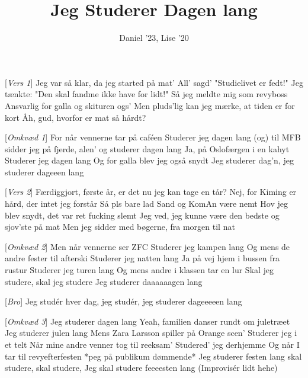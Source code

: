 \documentclass{article}
\title{Jeg Studerer Dagen lang}
\author{Daniel '23, Lise '20}
\begin{document}
\maketitle
\begin{roles}
\end{roles}

\begin{song}
    [\textit{Vers 1}] Jeg var så klar, da jeg started på mat'
    All' sagd' "Studielivet er fedt!"
    Jeg tænkte: "Den skal fandme ikke have for lidt!" 
    Så jeg meldte mig som revyboss
    Ansvarlig for galla og skituren ogs'
    Men pluds'lig kan jeg mærke, at tiden er for kort
    Åh, gud, hvorfor er mat så hårdt?

    [\textit{Omkvæd 1}] For når vennerne tar på caféen
     Studerer jeg dagen lang
     (og) til MFB sidder jeg på fjerde, alen'
     og studerer dagen lang
     Ja, på Oslofærgen i en kahyt
     Studerer jeg dagen lang
     Og for galla blev jeg også snydt
     Jeg studerer dag'n, jeg studerer dageeen lang

    [\textit{Vers 2}] Færdiggjort, første år, er det nu jeg kan tage en tår?  
    Nej, for Kiming er hård, der intet jeg forstår
    Så pls bare lad Sand og KomAn være nemt 
    Hov jeg blev snydt, det var ret fucking slemt
    Jeg ved, jeg kunne være den bedste og sjov'ste på mat
    Men jeg sidder med bøgerne, fra morgen til nat

    [\textit{Omkvæd 2}] Men når vennerne ser ZFC
     Studerer jeg kampen lang
     Og mens de andre fester til afterski
     Studerer jeg natten lang
     Ja på vej hjem i bussen fra rustur 
     Studerer jeg turen lang
     Og mens andre i klassen tar en lur 
     Skal jeg studere, skal jeg studere
    Jeg studerer daaaaaagen lang

    [\textit{Bro}] Jeg studér hver dag, jeg studér, jeg studerer dageeeeen lang 

    [\textit{Omkvæd 3}] Jeg studerer dagen lang
     Yeah, familien danser rundt om juletræet 
     Jeg studerer julen lang 
     Mens Zara Larsson spiller på Orange scen'
     Studerer jeg i et telt
     Når mine andre venner tog til reeksam'
     Studered' jeg derhjemme
     Og når I tar til revyefterfesten *peg på publikum dømmende*
     Jeg studerer festen lang
    skal studere, skal studere,
    Jeg skal studere feeeesten lang
    (Improvisér lidt hehe) 
\end{song}
\end{document}

